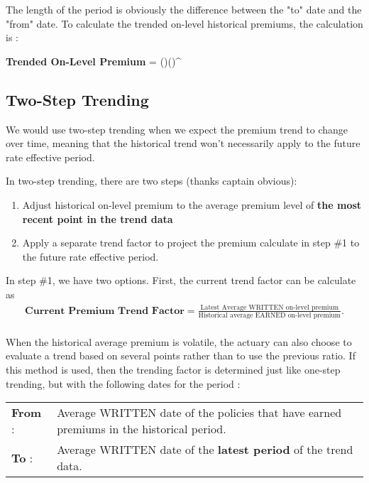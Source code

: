 \documentclass[11pt, english]{memoir}
\numberwithin{definition}{section}
\begin{document}
	The length of the period is obviously the difference between the "to" date and the "from" date. To calculate the trended on-level historical premiums, the calculation is : 
	\begin{tcolorbox} 
	\textbf{Trended On-Level Premium} = ()()^{}
	\end{tcolorbox}
	
	
	\subsection{Two-Step Trending}
	We would use two-step trending when we expect the premium trend to change over time, meaning that the historical trend won't necessarily apply to the future rate effective period.
	
	In two-step trending, there are two steps (thanks captain obvious): 
	\begin{enumerate}
		\item Adjust historical on-level premium to the average premium level of \textbf{the most recent point in the trend data}
		\item Apply a separate trend factor to project the premium calculate in step \#1 to the future rate effective period.
	\end{enumerate} 
	
	\begin{tcolorbox}[adjusted title = \textbf{Step \#1}]
		In step \#1, we have two options. First, the current trend factor can be calculate as 
		\begin{align*}
		\textbf{Current Premium Trend Factor} = \frac{\text{Latest Average WRITTEN on-level premium}}{\text{Historical average EARNED on-level premium}}.
		\end{align*}\\
		
		When the historical average premium is volatile, the actuary can also choose to evaluate a trend based on several points rather than to use the previous ratio. If this method is used, then the trending factor is determined just like one-step trending, but with the following dates for the period : \\
				
		\begin{tabular}{ll}
		 	\textbf{From} : & 	\begin{minipage}{0.8\linewidth}
							 		Average WRITTEN date of the policies that have earned premiums in the historical period.
							 	\end{minipage}\\[10pt]
		 	\textbf{To} : & \begin{minipage}{0.8\linewidth}
						 		Average WRITTEN date of the \textbf{latest period} of the trend data.
						 	\end{minipage}\\ 
		 \end{tabular}\\
	\end{tcolorbox}
	
\end{document}
